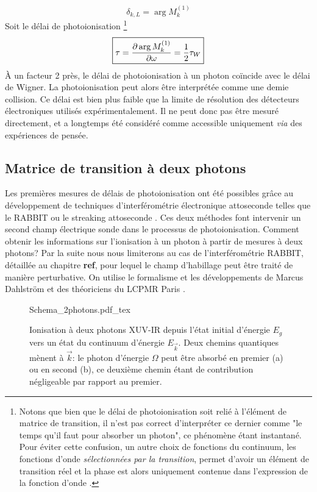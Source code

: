\begin{equation}
\delta_{k,L} = \arg M^{(1)}_{k} 
\end{equation}
Soit le délai de photoionisation \footnote{Notons que bien que le délai de photoionisation soit relié à l'élément de matrice de transition, il n'est pas correct d'interpréter ce dernier comme "le temps qu'il faut pour absorber un photon", ce phénomène étant instantané. Pour éviter cette confusion, un autre choix de fonctions du continuum, les fonctions d'onde \textit{sélectionnées par la transition}, permet d'avoir un élément de transition réel et la phase est alors uniquement contenue dans l'expression de la fonction d'onde .}
\begin{equation}
\setlength\fboxrule{0.5pt}
\boxed{
\tau = \frac{\partial \arg M^{(1)}_{k}}{\partial \omega} = \frac{1}{2} \tau_W
}
\end{equation}
\`A un facteur 2 près, le délai de photoionisation à un photon coïncide avec le délai de Wigner. La photoionisation peut alors être interprétée comme une demie collision. Ce délai est bien plus faible que la limite de résolution des détecteurs électroniques utilisés expérimentalement. Il ne peut donc pas être mesuré directement, et a longtemps été considéré comme accessible uniquement \textit{via} des expériences de pensée.

\subsection{Matrice de transition à deux photons}
\label{sec:Matrice2photons}
Les premières mesures de délais de photoionisation ont été possibles grâce au développement de techniques d'interférométrie électronique attoseconde telles que le RABBIT  ou le streaking attoseconde . Ces deux méthodes font intervenir un second champ électrique sonde dans le processus de photoionisation. Comment obtenir les informations sur l'ionisation à un photon à partir de mesures à deux photons? Par la suite nous nous limiterons au cas de l'interférométrie RABBIT, détaillée au chapitre \textbf{ref}, pour lequel le champ d'habillage peut être traité de manière perturbative. On utilise le formalisme et les développements de Marcus Dahlström et des théoriciens du LCPMR Paris .

\begin{figure}
\centering
\def\svgwidth{0.7\columnwidth}
{Schema_2photons.pdf_tex}
\caption{Ionisation à deux photons XUV-IR depuis l'état initial d'énergie $E_g$ vers un état du continuum d'énergie $E_{\vec{k}}$. Deux chemins quantiques mènent à $\vec{k}$: le photon d'énergie $\Omega$ peut être absorbé en premier (a) ou en second (b), ce deuxième chemin étant de contribution négligeable par rapport au premier.}
\label{fig:Schema_2photons}
\end{figure}

